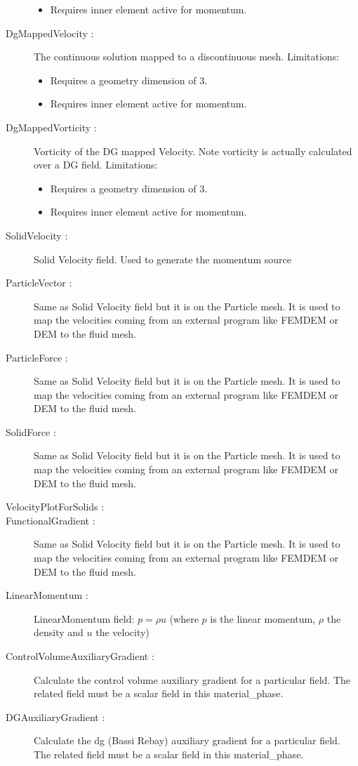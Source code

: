 \begin{description}
\begin{itemize}
	\item Requires inner element active for momentum.
	\end{itemize}    
 \item[DgMappedVelocity :] The continuous solution mapped to a discontinuous mesh.
	Limitations: 
	\begin{itemize}
	\item Requires a geometry dimension of 3.
	\item Requires inner element active for momentum.
	\end{itemize}    
 \item[DgMappedVorticity :] Vorticity of the DG mapped Velocity. Note vorticity is actually calculated over a DG field.
	Limitations:
	\begin{itemize}
	\item Requires a geometry dimension of 3.
	\item Requires inner element active for momentum.
	\end{itemize}    
 \item[SolidVelocity :] Solid Velocity field.  Used to generate the momentum source     
 \item[ParticleVector :] Same as Solid Velocity field but it is on the Particle mesh. It is used to map the velocities coming from an external program like FEMDEM or DEM to the fluid mesh.     
 \item[ParticleForce :] Same as Solid Velocity field but it is on the Particle mesh. It is used to map the velocities coming from an external program like FEMDEM or DEM to the fluid mesh.     
 \item[SolidForce :] Same as Solid Velocity field but it is on the Particle mesh. It is used to map the velocities coming from an external program like FEMDEM or DEM to the fluid mesh.     
 \item[VelocityPlotForSolids :]     
 \item[FunctionalGradient :] Same as Solid Velocity field but it is on the Particle mesh. It is used to map the velocities coming from an external program like FEMDEM or DEM to the fluid mesh.     
 \item[LinearMomentum :] LinearMomentum field: $p = \rho u$ (where $p$ is the linear momentum, $\rho$ the density and $u$ the velocity)    
 \item[ControlVolumeAuxiliaryGradient :] Calculate the control volume auxiliary gradient for a particular field. The related field must be a scalar field in this material\_phase.    
 \item[DGAuxiliaryGradient :] Calculate the dg (Bassi Rebay) auxiliary gradient for a particular field. The related field must be a scalar field in this material\_phase.    

\end{description}
